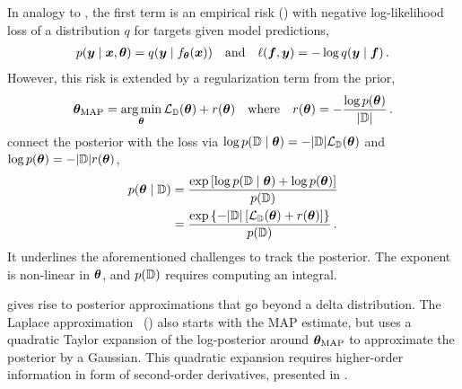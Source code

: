 In analogy to ,
the first term is an empirical risk
() with negative
log-likelihood loss of a distribution $q$ for targets given model predictions,
\begin{align}\label{eq:background::connectionsMAPandEmpiricalRiskMinimization}
  p({\bm{y}}\;|\;{\bm{x}},{\bm{\theta}})
  = q({\bm{y}}\;|\;f_{{\bm{\theta}}}({\bm{x}}))
  \quad\text{and}\quad
  \ell({\bm{f}}, {\bm{y}})
  = - \log q({\bm{y}}\;|\;{\bm{f}})\,.
\end{align}
However, this risk is extended by a regularization term from the prior,
\begin{align}\label{eq:background::MAPLoss}
  {\bm{\theta}}_{\text{MAP}}
  =
  \operatorname*{arg\,min}_{{\bm{\theta}}}
  {\mathcal{L}}_{\mathbb{D}}({\bm{\theta}}) + r({\bm{\theta}})
  \quad
  \text{where}
  \quad
  r({\bm{\theta}}) = - \frac{\log p({\bm{\theta}})}{|{\mathbb{D}}|}\,.
\end{align}
connect the posterior with the loss via $ \log p({\mathbb{D}}\;|\;{\bm{\theta}}) = -
|{\mathbb{D}}| {\mathcal{L}}_{{\mathbb{D}}}({\bm{\theta}})$ and $\log p({\bm{\theta}}) = - |{\mathbb{D}}| r({\bm{\theta}})$,
\begin{align}\label{eq:background::RelationPosteriorLossRegularization}
  \begin{split}
    p({\bm{\theta}}\;|\;{\mathbb{D}})
    &=
      \frac{
      \exp
      \left[
      \log p({\mathbb{D}}\;|\;{\bm{\theta}})
      + \log p({\bm{\theta}})
      \right]
      }{
      p({\mathbb{D}})
      }
    \\
    &=
      \frac{
      \exp\left\{
      -|{\mathbb{D}}| \left[
      {\mathcal{L}}_{{\mathbb{D}}}({\bm{\theta}}) + r({\bm{\theta}})
      \right]
      \right\}
      }{p({\mathbb{D}})}\,.
  \end{split}
\end{align}
It underlines the aforementioned challenges to track the posterior. The
exponent is non-linear in ${\bm{\theta}}$, and $p({\mathbb{D}})$ requires computing an
integral.

 gives rise to
posterior approximations that go beyond a delta distribution. The Laplace
approximation~\cite{laplace1774memoire}
() also starts with the MAP estimate,
but uses a quadratic Taylor expansion of the log-posterior around
${\bm{\theta}}_{\text{MAP}}$ to approximate the posterior by a Gaussian. This
quadratic expansion requires higher-order information in form of second-order
derivatives, presented in .

